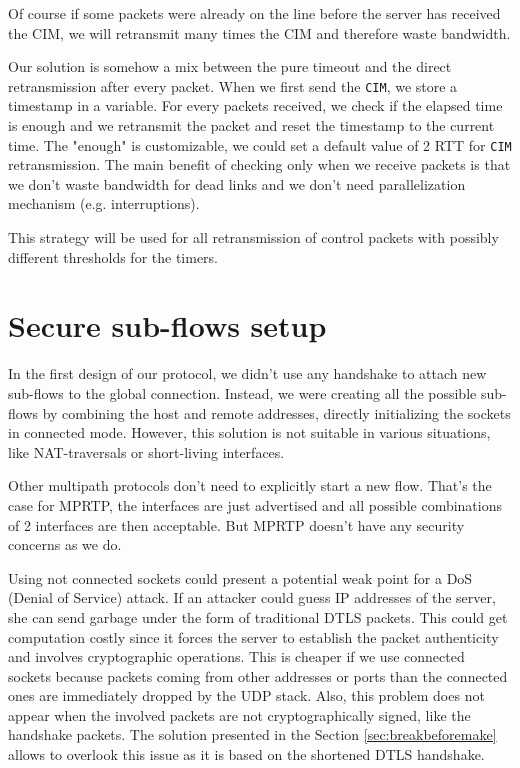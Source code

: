 Of course if some packets were already on the line before the server has received the CIM, we will retransmit many times the CIM and therefore waste bandwidth.

Our solution is somehow a mix between the pure timeout and the direct retransmission after every packet. When we first send the \texttt{CIM}, we store a timestamp in a variable. For every packets received, we check if the elapsed time is enough and we retransmit the packet and reset the timestamp to the current time. The "enough" is customizable, we could set a default value of 2 RTT for \texttt{CIM} retransmission. The main benefit of checking only when we receive packets is that we don't waste bandwidth for dead links and we don't need parallelization mechanism (e.g. interruptions).

This strategy will be used for all retransmission of control packets with possibly different thresholds for the timers.

\section{Secure sub-flows setup}\label{sec:setupflow}

In the first design of our protocol, we didn't use any handshake to attach new sub-flows to the global connection. Instead, we were creating all the possible sub-flows by combining the host and remote addresses, directly initializing the sockets in connected mode. However, this solution is not suitable in various situations, like NAT-traversals or short-living interfaces. 

Other multipath protocols don't need to explicitly start a new flow. That's the case for MPRTP, the interfaces are just advertised and all possible combinations of 2 interfaces are then acceptable. But MPRTP doesn't have any security concerns as we do.

Using not connected sockets could present a potential weak point for a DoS (Denial of Service) attack. If an attacker could guess IP addresses of the server, she can send garbage under the form of traditional DTLS packets. This could get computation costly since it forces the server to establish the packet authenticity and involves cryptographic operations. This is cheaper if we use connected sockets because packets coming from other addresses or ports than the connected ones are immediately dropped by the UDP stack. Also, this problem does not appear when the involved packets are not cryptographically signed, like the handshake packets. The solution presented in the Section \ref{sec:breakbeforemake} allows to overlook this issue as it is based on the shortened DTLS handshake.


